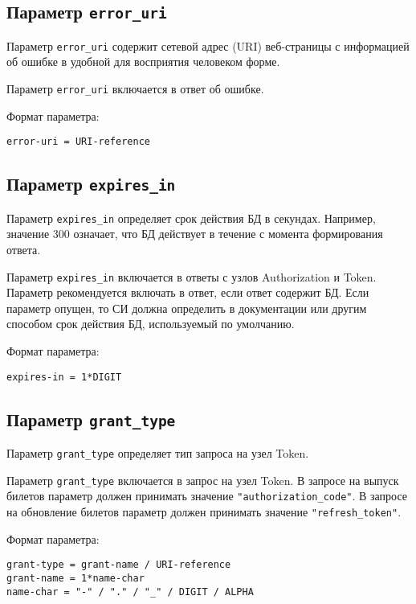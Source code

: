 \subsection{Параметр \lstinline{error_uri}}\label{PARAMS.ErrorUri}

Параметр \lstinline{error_uri} содержит сетевой адрес (URI) веб-страницы 
с информацией об ошибке в удобной для восприятия человеком форме.

Параметр \lstinline{error_uri} включается в ответ об ошибке.


Формат параметра:
\begin{lstlisting}
error-uri = URI-reference
\end{lstlisting}

\subsection{Параметр \lstinline{expires_in}}\label{PARAMS.ExpiresIn}

Параметр \lstinline{expires_in} определяет срок действия БД в секундах. 
%
Например, значение 300 означает, что БД действует в течение  с 
момента формирования ответа.

Параметр \lstinline{expires_in} включается в ответы с узлов Authorization и 
Token. 
%
Параметр рекомендуется включать в ответ, если ответ содержит БД.  
%
Если параметр опущен, то СИ должна определить в документации или другим способом
срок действия БД, используемый по умолчанию.

Формат параметра:
\begin{lstlisting}
expires-in = 1*DIGIT
\end{lstlisting}

\subsection{Параметр \lstinline{grant_type}}\label{PARAMS.GrantType}

Параметр \lstinline{grant_type} определяет тип запроса на узел Token.

Параметр \lstinline{grant_type} включается в запрос на узел Token.
%
В запросе на выпуск билетов параметр должен принимать значение 
\lstinline{"authorization_code"}.
%
В запросе на обновление билетов параметр должен принимать значение 
\lstinline{"refresh_token"}.

Формат параметра:
\begin{lstlisting}
grant-type = grant-name / URI-reference
grant-name = 1*name-char
name-char = "-" / "." / "_" / DIGIT / ALPHA
\end{lstlisting}

